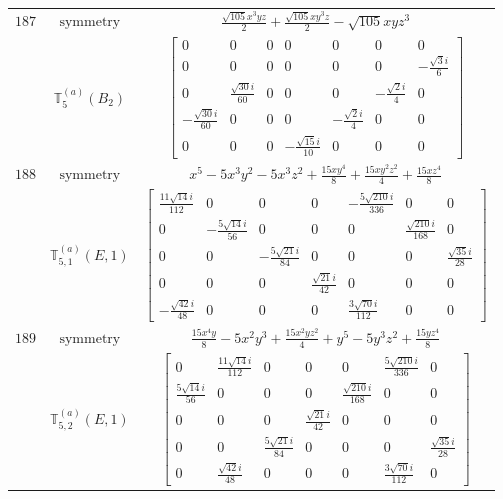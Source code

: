 \documentclass[fleqn,8pt,landscape]{jsarticle}
\begin{document}
\begin{longtable}{ccc}
$ 187 $ & $ \text{symmetry} $ & $ \frac{\sqrt{105} x^{3} y z}{2} + \frac{\sqrt{105} x y^{3} z}{2} - \sqrt{105} x y z^{3} $ \\
$  $ & $ \mathbb{T}_{5}^{(a)}(B_{2}) $ & $ \begin{bmatrix} 0 & 0 & 0 & 0 & 0 & 0 & 0 \\ 0 & 0 & 0 & 0 & 0 & 0 & - \frac{\sqrt{3} i}{6} \\ 0 & \frac{\sqrt{30} i}{60} & 0 & 0 & 0 & - \frac{\sqrt{2} i}{4} & 0 \\ - \frac{\sqrt{30} i}{60} & 0 & 0 & 0 & - \frac{\sqrt{2} i}{4} & 0 & 0 \\ 0 & 0 & 0 & - \frac{\sqrt{15} i}{10} & 0 & 0 & 0 \end{bmatrix} $ \\ \hline
$ 188 $ & $ \text{symmetry} $ & $ x^{5} - 5 x^{3} y^{2} - 5 x^{3} z^{2} + \frac{15 x y^{4}}{8} + \frac{15 x y^{2} z^{2}}{4} + \frac{15 x z^{4}}{8} $ \\
$  $ & $ \mathbb{T}_{5,1}^{(a)}(E,1) $ & $ \begin{bmatrix} \frac{11 \sqrt{14} i}{112} & 0 & 0 & 0 & - \frac{5 \sqrt{210} i}{336} & 0 & 0 \\ 0 & - \frac{5 \sqrt{14} i}{56} & 0 & 0 & 0 & \frac{\sqrt{210} i}{168} & 0 \\ 0 & 0 & - \frac{5 \sqrt{21} i}{84} & 0 & 0 & 0 & \frac{\sqrt{35} i}{28} \\ 0 & 0 & 0 & \frac{\sqrt{21} i}{42} & 0 & 0 & 0 \\ - \frac{\sqrt{42} i}{48} & 0 & 0 & 0 & \frac{3 \sqrt{70} i}{112} & 0 & 0 \end{bmatrix} $ \\ \hline
$ 189 $ & $ \text{symmetry} $ & $ \frac{15 x^{4} y}{8} - 5 x^{2} y^{3} + \frac{15 x^{2} y z^{2}}{4} + y^{5} - 5 y^{3} z^{2} + \frac{15 y z^{4}}{8} $ \\
$  $ & $ \mathbb{T}_{5,2}^{(a)}(E,1) $ & $ \begin{bmatrix} 0 & \frac{11 \sqrt{14} i}{112} & 0 & 0 & 0 & \frac{5 \sqrt{210} i}{336} & 0 \\ \frac{5 \sqrt{14} i}{56} & 0 & 0 & 0 & \frac{\sqrt{210} i}{168} & 0 & 0 \\ 0 & 0 & 0 & \frac{\sqrt{21} i}{42} & 0 & 0 & 0 \\ 0 & 0 & \frac{5 \sqrt{21} i}{84} & 0 & 0 & 0 & \frac{\sqrt{35} i}{28} \\ 0 & \frac{\sqrt{42} i}{48} & 0 & 0 & 0 & \frac{3 \sqrt{70} i}{112} & 0 \end{bmatrix} $ \\ \hline

\end{longtable}
\end{document}
